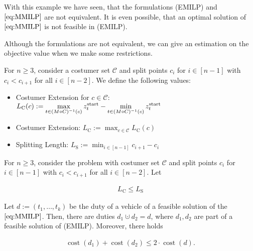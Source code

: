 With this example we have seen, that the formulations (EMILP) and $\eqref{eq:MMILP}$ are not equivalent. It is even possible, that an optimal solution of $\eqref{eq:MMILP}$ is not feasible in (EMILP).

Although the formulations are not equivalent, we can give an estimation on the objective value when we make some restrictions.

\begin{definition}

For $n\geq 3$, consider a costumer set $\mathcal{C}$ and split points $c_i$ for $i\in[n-1]$ with $c_i<c_{i+1}$ for all $i\in[n-2]$. We define the following values:

\begin{itemize}
	\item{Costumer Extension for $c\in\mathcal{C}$: $\displaystyle{L_{\operatorname{C}}(c) := \max_{t\in(M\circ C)^{-1}(c)}z^{\operatorname{start}}_t - \min_{t\in(M\circ C)^{-1}(c)}z^{\operatorname{start}}_t}$}
	\item{Costumer Extension: $\displaystyle{L_{\operatorname{C}} := \max_{c\in\mathcal{C}} L_{\operatorname{C}}(c)}$}
	\item{Splitting Length: $\displaystyle{L_{\operatorname{S}} := \min_{i\in[n-1]} c_{i+1}-c_i}$}
\end{itemize}

\end{definition}

\begin{theorem}

For $n\geq 3$, consider the problem with costumer set $\mathcal{C}$ and split points $c_i$ for $i\in[n-1]$ with $c_i<c_{i+1}$ for all $i\in[n-2]$. Let

\begin{align}
\label{eq:LCLS}
	L_{\operatorname{C}}\leq L_{\operatorname{S}}
\end{align}

Let $d:=\left(t_1,\dots,t_k\right)$ be the duty of a vehicle of a feasible solution of the $\eqref{eq:MMILP}$. Then, there are duties $d_1\cupdot d_2=d$, where $d_1,d_2$ are part of a feasible solution of (EMILP). Moreover, there holds

\begin{align}
	\operatorname{cost}\left(d_1\right)+\operatorname{cost}\left(d_2\right)\leq 2\cdot\operatorname{cost}\left(d\right).
\end{align}

\end{theorem}

